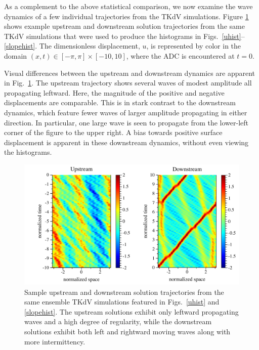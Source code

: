 \documentclass[11pt]{article}
\begin{document}
	As a complement to the above statistical comparison, we now examine the wave dynamics of a few individual trajectories from the TKdV simulations. Figure \ref{trajectories} shows example upstream and downstream solution trajectories from the same TKdV simulations that were used to produce the histograms in Figs.~\ref{uhist}--\ref{slopehist}. The dimensionless displacement, $u$, is represented by color in the domain $(x,t) \in [-\pi,\pi] \times [-10,10]$, where the ADC is encountered at $t=0$. 
	
	Visual differences between the upstream and downstream dynamics are apparent in Fig.~\ref{trajectories}. The upstream trajectory shows several waves of modest amplitude all propagating leftward. Here, the magnitude of the positive and negative displacements are comparable. This is in stark contrast to the downstream dynamics, which feature fewer waves of larger amplitude propagating in either direction. In particular, one large wave is seen to propagate from the lower-left corner of the figure to the upper right. A bias towards positive surface displacement is apparent in these downstream dynamics, without even viewing the histograms.

\begin{figure}%
\begin{center}
\includegraphics[width = 0.9 \linewidth]{Figs/trajectories.pdf}
\caption{
Sample upstream and downstream solution trajectories from the same ensemble TKdV simulations featured in Figs.~\ref{uhist} and \ref{slopehist}. The upstream solutions exhibit only leftward propagating waves and a high degree of regularity, while the downstream solutions exhibit both left and rightward moving waves along with more intermittency.
}
\label{trajectories}
\end{center}
\end{figure}
\end{document}
